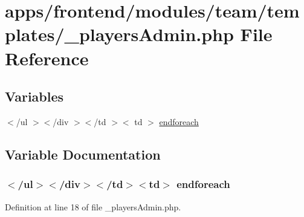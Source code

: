 \hypertarget{__players_admin_8php}{\section{apps/frontend/modules/team/templates/\-\_\-players\-Admin.php File Reference}
\label{__players_admin_8php}
}
\subsection*{Variables}
\begin{DoxyCompactItemize}
\item 
$<$/ul $>$$<$/div $>$$<$/td $>$$<$ td $>$ \hyperlink{__players_admin_8php_a567a8c1cc286ec36a1c8f7d5608c1bc0}{endforeach}
\end{DoxyCompactItemize}


\subsection{Variable Documentation}
\hypertarget{__players_admin_8php_a567a8c1cc286ec36a1c8f7d5608c1bc0}{
\subsubsection[{endforeach}]{\setlength{\rightskip}{0pt plus 5cm}$<$/ul$>$$<$/div$>$$<$/td$>$$<$td$>$ endforeach}}\label{__players_admin_8php_a567a8c1cc286ec36a1c8f7d5608c1bc0}


Definition at line 18 of file \-\_\-players\-Admin.\-php.

